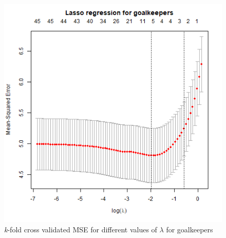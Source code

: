 \begin{figure}[H]
    \centering
    \includegraphics[scale=0.55]{fig/chapter_6/lasso_GLK.png}
    \caption{\textit{k}-fold cross validated MSE for different values of $\lambda$ for goalkeepers}
\label{fig:lasso_GLK}    
\end{figure}

